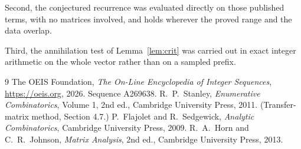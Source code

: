 \documentclass[11pt,a4paper]{article}
\theoremstyle{plain}
\theoremstyle{definition}
\begin{document}
Second, the conjectured recurrence was evaluated directly on those published terms, with no
matrices involved, and holds wherever the proved range and the data overlap.

Third, the annihilation test of Lemma~\ref{lem:crit} was carried out in exact integer
arithmetic on the whole vector rather than on a sampled prefix.

\begin{thebibliography}{9}
 The OEIS Foundation, \emph{The On-Line Encyclopedia of Integer
Sequences}, \url{https://oeis.org}, 2026. Sequence A269638.
 R.~P.~Stanley, \emph{Enumerative Combinatorics}, Volume 1, 2nd ed.,
Cambridge University Press, 2011. (Transfer-matrix method, Section 4.7.)
 P.~Flajolet and R.~Sedgewick, \emph{Analytic Combinatorics}, Cambridge
University Press, 2009.
 R.~A.~Horn and C.~R.~Johnson, \emph{Matrix Analysis}, 2nd ed., Cambridge
University Press, 2013.
\end{thebibliography}
\end{document}
